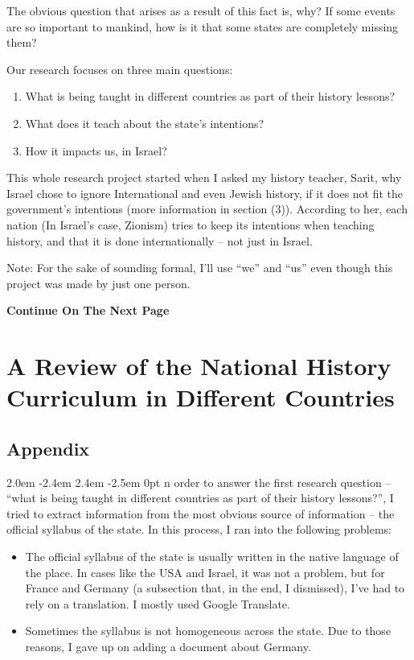 \documentclass[12pt]{article}
\def\gothstart#1{\noindent\smash{\lower3ex\hbox{\llap{\Huge\gothfamily#1}}}
	\parshape=3 2.0em \dimexpr\hsize-2.4em 2.4em \dimexpr\hsize-2.5em 0pt \hsize}
\newcommand \npage {\vfil {\hfil \textbf{\footnotesize {Continue On The Next Page}}} \hfil \vfil \pagebreak}
\begin{document}
	The obvious question that arises as a result of this fact is, why? If some events are so important to mankind, how is it that some states are completely missing them? 
	
	Our research focuses on three main questions: 
	\begin{enumerate}
		\item What is being taught in different countries as part of their history lessons? 
		\item What does it teach about the state's intentions? 
		\item How it impacts us, in Israel? 
	\end{enumerate}
	
	This whole research project started when I asked my history teacher, Sarit, why Israel chose to ignore International and even Jewish history, if it does not fit the government's intentions (more information in section (3)). According to her, each nation (In Israel's case, Zionism) tries to keep its intentions when teaching history, and that it is done internationally -- not just in Israel. 
	
	{\scriptsize Note: For the sake of sounding formal, I'll use ``we'' and ``us'' even though this project was made by just one person. }
	
	\npage
	\section{A Review of the National History Curriculum in Different Countries}
	\subsection{Appendix}
	\gothstart{I}n order to answer the first research question -- ``what is being taught in different countries as part of their history lessons?'', I tried to extract information from the most obvious source of information -- the official syllabus of the state. In this process, I ran into the following problems: 
	\begin{itemize}
		\item The official syllabus of the state is usually written in the native language of the place. In cases like the USA and Israel, it was not a problem, but for France and Germany (a subsection that, in the end, I dismissed), I've had to rely on a translation. I mostly used Google Translate. 
		\item Sometimes the syllabus is not homogeneous across the state. Due to those reasons, I gave up on adding a document about Germany. 
	\end{itemize}
	
\end{document}
